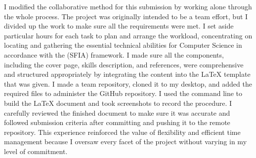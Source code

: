 \documentclass[a4paper, 11pt]{report}
\begin{document}
I modified the collaborative method for this submission by working alone through the whole process. The project was originally intended to be a team effort, but I divided up the work to make sure all the requirements were met. I set aside particular hours for each task to plan and arrange the workload, concentrating on locating and gathering the essential technical abilities for Computer Science in accordance with the (SFIA) framework. I made sure all the components, including the cover page, skills description, and references, were comprehensive and structured appropriately by integrating the content into the LaTeX template that was given. I made a team repository, cloned it to my desktop, and added the required files to administer the GitHub repository. I used the command line to build the LaTeX document and took screenshots to record the procedure. I carefully reviewed the finished document to make sure it was accurate and followed submission criteria after committing and pushing it to the remote repository. This experience reinforced the value of flexibility and efficient time management because I oversaw every facet of the project without varying in my level of commitment.


\newpage



\end{document}
